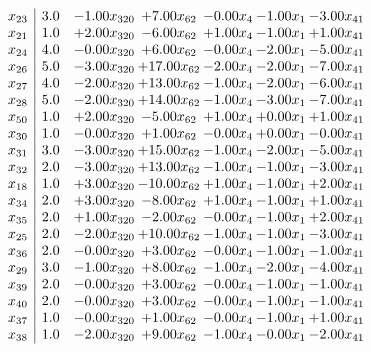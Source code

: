 \documentclass[8pt]{article}
\begin{document}
\[\begin{array}{c| c c@{\hskip 2pt} c@{\hskip 2pt} c@{\hskip 2pt} c@{\hskip 2pt} c@{\hskip 2pt} }
 x_{23}   &  3.0 & -1.00 x_{320} & +  7.00 x_{62} & -0.00 x_{4} & -1.00 x_{1} & -3.00 x_{41}\\
 x_{21}   &  1.0 & +  2.00 x_{320} & -6.00 x_{62} & +  1.00 x_{4} & -1.00 x_{1} & +  1.00 x_{41}\\
 x_{24}   &  4.0 & -0.00 x_{320} & +  6.00 x_{62} & -0.00 x_{4} & -2.00 x_{1} & -5.00 x_{41}\\
 x_{26}   &  5.0 & -3.00 x_{320} & + 17.00 x_{62} & -2.00 x_{4} & -2.00 x_{1} & -7.00 x_{41}\\
 x_{27}   &  4.0 & -2.00 x_{320} & + 13.00 x_{62} & -1.00 x_{4} & -2.00 x_{1} & -6.00 x_{41}\\
 x_{28}   &  5.0 & -2.00 x_{320} & + 14.00 x_{62} & -1.00 x_{4} & -3.00 x_{1} & -7.00 x_{41}\\
 x_{50}   &  1.0 & +  2.00 x_{320} & -5.00 x_{62} & +  1.00 x_{4} & +  0.00 x_{1} & +  1.00 x_{41}\\
 x_{30}   &  1.0 & -0.00 x_{320} & +  1.00 x_{62} & -0.00 x_{4} & +  0.00 x_{1} & -0.00 x_{41}\\
 x_{31}   &  3.0 & -3.00 x_{320} & + 15.00 x_{62} & -1.00 x_{4} & -2.00 x_{1} & -5.00 x_{41}\\
 x_{32}   &  2.0 & -3.00 x_{320} & + 13.00 x_{62} & -1.00 x_{4} & -1.00 x_{1} & -3.00 x_{41}\\
 x_{18}   &  1.0 & +  3.00 x_{320} & -10.00 x_{62} & +  1.00 x_{4} & -1.00 x_{1} & +  2.00 x_{41}\\
 x_{34}   &  2.0 & +  3.00 x_{320} & -8.00 x_{62} & +  1.00 x_{4} & -1.00 x_{1} & +  1.00 x_{41}\\
 x_{35}   &  2.0 & +  1.00 x_{320} & -2.00 x_{62} & -0.00 x_{4} & -1.00 x_{1} & +  2.00 x_{41}\\
 x_{25}   &  2.0 & -2.00 x_{320} & + 10.00 x_{62} & -1.00 x_{4} & -1.00 x_{1} & -3.00 x_{41}\\
 x_{36}   &  2.0 & -0.00 x_{320} & +  3.00 x_{62} & -0.00 x_{4} & -1.00 x_{1} & -1.00 x_{41}\\
 x_{29}   &  3.0 & -1.00 x_{320} & +  8.00 x_{62} & -1.00 x_{4} & -2.00 x_{1} & -4.00 x_{41}\\
 x_{39}   &  2.0 & -0.00 x_{320} & +  3.00 x_{62} & -0.00 x_{4} & -1.00 x_{1} & -1.00 x_{41}\\
 x_{40}   &  2.0 & -0.00 x_{320} & +  3.00 x_{62} & -0.00 x_{4} & -1.00 x_{1} & -1.00 x_{41}\\
 x_{37}   &  1.0 & -0.00 x_{320} & +  1.00 x_{62} & -0.00 x_{4} & -1.00 x_{1} & +  1.00 x_{41}\\
 x_{38}   &  1.0 & -2.00 x_{320} & +  9.00 x_{62} & -1.00 x_{4} & -0.00 x_{1} & -2.00 x_{41}\\

\end{array}\]
\end{document}
